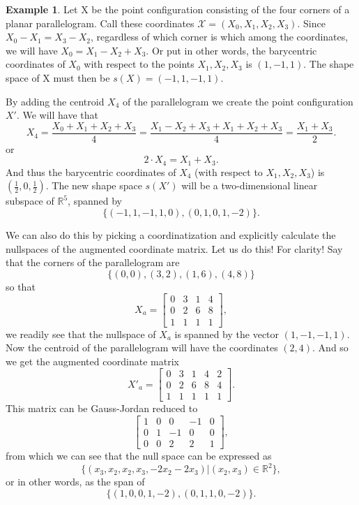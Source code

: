 \documentclass[a4paper,12pt]{book}
\theoremstyle{plain}
\theoremstyle{definition}
\newtheorem{Example}[equation]{Example}
\begin{document}
\begin{Example}
	Let X be the point configuration consisting of the four corners of a planar
	parallelogram. Call these coordinates 
	\( \mathcal{X} = (X_0, X_1, X_2, X_3) \). Since 
	\( X_0 - X_1 = X_3 - X_2 \), regardless of which corner is which 
	among the coordinates, we will have \( X_0 = X_1 - X_2 + X_3 \). Or put in
	other words, the barycentric coordinates of \( X_0 \) with respect
	to the points \( X_1, X_2, X_3 \) is \( (1, -1, 1) \). The shape space
	of X must then be \( s(X) = (-1, 1, -1, 1) \).

	By adding the centroid \( X_4 \) of the parallelogram
	we create the point
	configuration \( X' \). We will have that
	\[
		X_4 = \frac{X_0 + X_1 + X_2 + X_3}{4} = 
		\frac{X_1 - X_2 + X_3 + X_1 + X_2 + X_3}{4} = 
		\frac{X_1 + X_3}{2}.
	\]
	or
	\[
		2 \cdot X_4 = X_1 + X_3.
	\]
	And thus the barycentric coordinates of \( X_4 \) (with respect to
	\( X_1, X_2, X_3 \)) is \( \left(\frac{1}{2}, 0, \frac{1}{2}\right) \).
	The new shape space \( s(X') \) will be a two-dimensional linear subspace 
	of \( \mathbb{R}^5 \), spanned by
	\[
		\{(-1, 1, -1, 1, 0), (0, 1, 0, 1, -2)\}.
	\]

	We can also do this by picking a coordinatization and explicitly calculate
	the nullspaces of the augmented coordinate matrix. Let us do this! 
	For clarity!
	Say that the corners of the parallelogram are
	\[
		\{(0, 0), (3, 2), (1, 6), (4, 8)\}
	\]
	so that
	\[
		X_a = \begin{bmatrix}
			0 & 3 & 1 & 4 \\
			0 & 2 & 6 & 8 \\
			1 & 1 & 1 & 1
		\end{bmatrix},
	\]
	we readily see that the nullspace of \( X_a \) is spanned by the
	vector \( (1, -1, -1, 1) \). Now the centroid of the parallelogram will
	have the coordinates \( (2, 4) \). And so we get the augmented coordinate
	matrix
	\[
		X'_a = \begin{bmatrix}
			0 & 3 & 1 & 4 & 2 \\
			0 & 2 & 6 & 8 & 4 \\
			1 & 1 & 1 & 1 & 1
		\end{bmatrix}.
	\]
	This matrix can be Gauss-Jordan reduced to 
	\[
		\begin{bmatrix}
			1 & 0 & 0 & -1 & 0 \\
			0 & 1 & -1 & 0 & 0 \\
			0 & 0 & 2 & 2 & 1
		\end{bmatrix},
	\]
	from which we can see that the null space can be expressed as
	\[
		\{(x_3, x_2, x_2, x_3, -2x_2 -2x_3) | (x_2, x_3) \in \mathbb{R}^2\},
	\]
	or in other words, as the span of
	\[
		\{ (1, 0, 0, 1, -2), (0, 1, 1, 0, -2) \}.
	\]
\end{Example}
\end{document}
